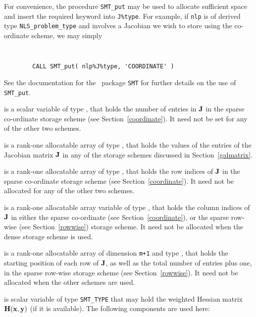 \documentclass{galahad}
\newcommand{\packagename}{NLS}
\begin{document}
\begin{description}
\begin{description}
For convenience, the procedure {\tt SMT\_put}
may be used to allocate sufficient space and insert the required keyword
into {\tt J\%type}.
For example, if {\tt nlp} is of derived type {\tt \packagename\_problem\_type}
and involves a Jacobian we wish to store using the co-ordinate scheme,
we may simply
{\tt
\begin{verbatim}
        CALL SMT_put( nlp%J%type, 'COORDINATE' )
\end{verbatim}
}
\noindent
See the documentation for the \galahad\ package {\tt SMT}
for further details on the use of {\tt SMT\_put}.

 is a scalar variable of type \integer, that
holds the number of entries in ${\mathbf{J}}$
in the sparse co-ordinate storage scheme (see Section~\ref{coordinate}).
It need not be set for any of the other two schemes.

 is a rank-one allocatable array of type \realdp, that holds
the values of the entries of the Jacobian matrix ${\mathbf{J}}$ in any of the
storage schemes discussed in Section~\ref{galmatrix}.

 is a rank-one allocatable array of type \integer,
that holds the row indices of ${\mathbf{J}}$ in the sparse co-ordinate storage
scheme (see Section~\ref{coordinate}).
It need not be allocated for any of the other two schemes.

 is a rank-one allocatable array variable of type \integer,
that holds the column indices of ${\mathbf{J}}$ in either the sparse co-ordinate
(see Section~\ref{coordinate}), or the sparse row-wise
(see Section~\ref{rowwise}) storage scheme.
It need not be allocated when the dense storage scheme is used.

 is a rank-one allocatable array of dimension {\tt m+1} and type
\integer, that holds the starting position of each row of ${\mathbf{J}}$, as well
as the total number of entries plus one, in the sparse row-wise storage
scheme (see Section~\ref{rowwise}). It need not be allocated when the
other schemes are used.

\end{description}

 is scalar variable of type {\tt SMT\_TYPE} that may hold the
weighted Hessian matrix ${\mathbf{H}}({\mathbf{x}},{\mathbf{y}})$ (if it is available).
The following components are used here:

\begin{description}


\end{description}
\end{description}
\end{document}
